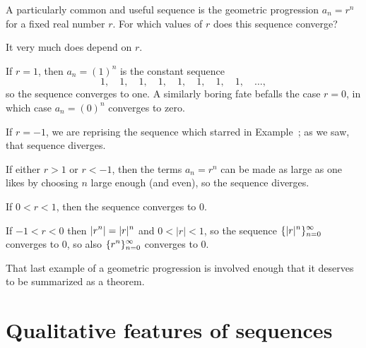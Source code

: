 \begin{example}
A particularly common and useful sequence is the geometric progression $a_n = r^n$
for a fixed real number $r$.  For which values of $r$ does this sequence converge?
\end{example}

\begin{solution}
It very much does depend on $r$.

If $r=1$, then $a_n = (1)^n$ is the constant sequence
$$
1,\quad
1,\quad
1,\quad
1,\quad
1,\quad
1,\quad
1,\quad
1,\quad \ldots,
$$
so the sequence converges to one.  A similarly boring fate befalls the
case $r = 0$, in which case $a_n = (0)^n$ converges to zero.

If $r=-1$, we are reprising the sequence which starred in
Example~; as we saw, that sequence
diverges.

If either $r>1$ or $r<-1$, then the terms $a_n = r^n$ can be made as
large as one likes by choosing $n$ large enough (and even), so the
sequence diverges.

If $0<r<1$, then the sequence converges to 0. 

If $-1<r<0$ then $\displaystyle |r^n|=|r|^n$ and $0<|r|<1$, so the sequence
$\displaystyle \{|r|^n\}_{n=0}^\infty$ converges to 0, so also 
$\displaystyle\{r^n\}_{n=0}^\infty$ converges to 0.
\end{solution}

That last example of a geometric progression is involved enough that
it deserves to be summarized as a theorem.


\section{Qualitative features of sequences}
\label{section:qualitative-features-of-sequences}


